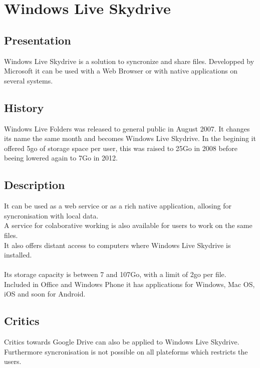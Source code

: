 \section{Windows Live Skydrive}
\thispagestyle{EIP} %

\subsection{Presentation}
Windows Live Skydrive is a solution to syncronize and share files. Developped by Microsoft it can be used with a Web Browser or with native applications on several systems.

\subsection{History}
Windows Live Folders was released to general public in August 2007. It changes its name the same month and becomes Windows Live Skydrive. In the begining it offered 5go of storage space per user, this was raised to 25Go in 2008 before beeing lowered again to 7Go in 2012.\\

\subsection{Description}
It can be used as a web service or as a rich native application, allosing for syncronisation with local data.\\
A service for colaborative working is also available for users to work on the same files.\\
It also offers distant access to computers where Windows Live Skydrive is installed.\\
\\
Its storage capacity is between 7 and 107Go, with a limit of 2go per file.\\
Included in Office and Windows Phone it has applications for Windows, Mac OS, iOS and soon for Android.\\

\subsection{Critics}
Critics towards Google Drive can also be applied to Windows Live Skydrive. Furthermore syncronisation is not possible on all plateforms which restricts the users.
